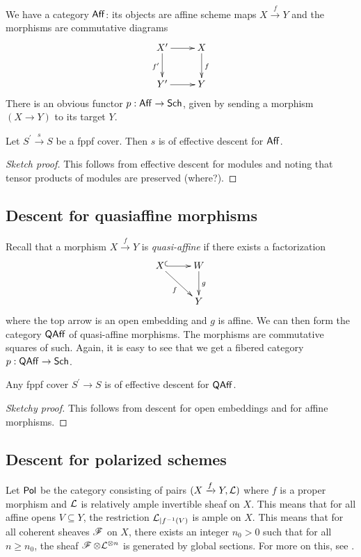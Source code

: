 \documentclass[11pt, english]{article}
\begin{document}
We have a category $\mathsf{Aff}$: its objects are affine scheme maps $X \xrightarrow{f} Y$ and the morphisms are commutative diagrams
\[
\xymatrix{
X^\prime \ar[d]_{f^\prime} \ar[r] & X \ar[d]^f \\
Y^\prime \ar[r] & Y
}
\]
There is an obvious functor $p:\mathsf{Aff} \to \mathsf{Sch}$, given by sending a morphism $(X \to Y)$ to its target $Y$. 

\begin{prop}
Let $S^\prime \xrightarrow{s} S$ be a fppf cover. Then $s$ is of effective descent for $\mathsf{Aff}$.
\end{prop}
\begin{proof}[Sketch proof]
This follows from effective descent for modules and noting that tensor products of modules are preserved (where?).
\end{proof}

\subsection{Descent for quasiaffine morphisms}

Recall that a morphism $X \xrightarrow{f} Y$ is \emph{quasi-affine} if there exists a factorization
\[
\xymatrix{
X \ar[dr]_f \ar@{^(->}[r] & W \ar[d]^g \\
 & Y
}
\]
where the top arrow is an open embedding and $g$ is affine. We can then form the category $\mathsf{QAff}$ of quasi-affine morphisms. The morphisms are commutative squares of such. Again, it is easy to see that we get a fibered category $p:\mathsf{QAff} \to \mathsf{Sch}$.

\begin{prop}
Any fppf cover $S^\prime \to S$ is of effective descent for $\mathsf{QAff}$.
\end{prop}
\begin{proof}[Sketchy proof]

This follows from descent for open embeddings and for affine morphisms. 
\end{proof}

\subsection{Descent for polarized schemes}

Let $\mathsf{Pol}$ be the category consisting of pairs $(X \xrightarrow{f} Y, \mathcal{L})$ where $f$ is a proper morphism and $\mathcal{L}$ is relatively ample invertible sheaf on $X$. This means that for all affine opens $V \subseteq Y$, the restriction $\mathcal{L}_{|f^{-1}(V)}$ is ample on $X$. This means that for all coherent sheaves $\operatorname{\mathscr{F}}$ on $X$, there exists an integer $n_0 > 0$ such that for all $n \geq n_0$, the sheaf $\operatorname{\mathscr{F}} \otimes \mathcal{L}^{\otimes n}$ is generated by global sections. For more on this, see \cite{hartshorne}.
\end{document}
